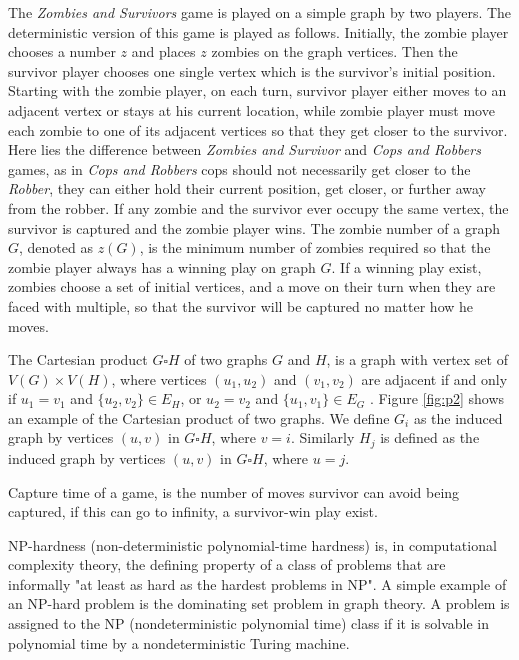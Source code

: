 \documentclass[1p]{elsarticle}
\begin{document}
The {\it Zombies and Survivors} game is played on a simple graph by two players. The deterministic version of this game
\cite{Fitz16} is played as follows. Initially, the zombie player chooses a number $z$ and places $z$ zombies on the
graph vertices. Then the survivor player chooses one single vertex which is the survivor's initial position. Starting
with the zombie player, on each turn, survivor player either moves to an adjacent vertex or stays at his current
location, while zombie player must move each zombie to one of its adjacent vertices so that they get closer to the
survivor. Here lies the difference between {\it Zombies and Survivor} and {\it Cops and Robbers} games, as in {\it Cops
and Robbers} cops should not necessarily get closer to the {\it Robber}, they can either hold their current position,
get closer, or further away from the robber. If any zombie and the survivor ever occupy the same vertex, the survivor is
captured and the zombie player wins. The zombie number of a graph $G$, denoted as $z(G)$, is the minimum number of
zombies required so that the zombie player always has a winning play on graph $G$. If a winning play exist, zombies
choose a set of initial vertices, and a move on their turn when they are faced with multiple, so that the survivor will
be captured no matter how he moves.

The Cartesian product $G \square H$ of two graphs $G$ and $H$, is a graph with vertex set of $V(G) \times V(H)$, where
vertices $(u_1 , u_2)$ and $(v_1 , v_2)$ are adjacent if and only if $u_1 = v_1$ and $ \{ u_2 , v_2 \} \in E_{H} $, or
$u_2 = v_2$ and $ \{u_1 , v_1 \} \in E_{G}$ \cite{West02}. Figure \ref{fig:p2} shows an example of the Cartesian product
of two graphs. We define $G_{i}$ as the induced graph by vertices $(u,v)$ in $G \square H$, where $v=i$. Similarly
$H_{j}$ is defined as the induced graph by vertices $(u,v)$ in $G \square H$, where $u=j$.

Capture time of a game, is the number of moves survivor can avoid being captured, if this can go to infinity, a survivor-win play exist.

NP-hardness (non-deterministic polynomial-time hardness) is, in computational complexity theory, the defining property
of a class of problems that are informally "at least as hard as the hardest problems in NP". A simple example of an
NP-hard problem is the dominating set problem in graph theory. A problem is assigned to the NP (nondeterministic polynomial time) class if
it is solvable in polynomial time by a nondeterministic Turing machine.
\end{document}
